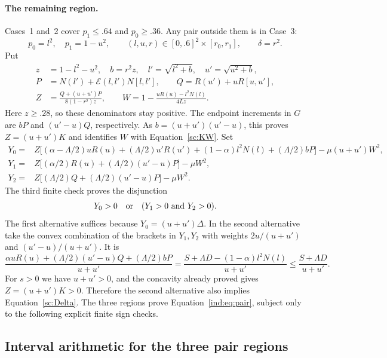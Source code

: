 \paragraph{The remaining region.}
Cases~1 and~2 cover $p_1\leq.64$ and $p_0\geq.36$.
Any pair outside them is in Case~3:
\[
 p_0=l^2,\quad p_1=1-u^2,\qquad
 (l,u,r)\in[0,.6]^2\times[r_0,r_1],\qquad \delta=r^2.
\]
Put
\begin{align}
 z&=1-l^2-u^2,\quad b=r^2z,\quad
 l'=\sqrt{l^2+b},\quad u'=\sqrt{u^2+b},\nonumber\\
 P&=N(l')+\mathcal E(l,l')N[l,l'],\qquad
 Q=R(u')+uR[u,u'],\label{sc:case3-data}\\
 Z&=\frac{Q+(u+u')P}{8(1-r^2)z},\qquad
 W=1-\frac{uR(u)-l^2N(l)}{4Lz}.\nonumber
\end{align}
Here $z\geq.28$, so these denominators stay positive.  The endpoint
increments in $G$ are $bP$ and $(u'-u)Q$, respectively.  As
$b=(u+u')(u'-u)$, this proves $Z=(u+u')K$ and identifies $W$ with
Equation~\eqref{sc:KW}.  Set
\begin{align}
 Y_0={}&Z\bigl[(\alpha-\Lambda/2)uR(u)
       +(\Lambda/2)u'R(u')+(1-\alpha)l^2N(l)
       +(\Lambda/2)bP\bigr]-\mu(u+u')W^2,\nonumber\\
 Y_1={}&Z\bigl[(\alpha/2)R(u)
                   +(\Lambda/2)(u'-u)P\bigr]-\mu W^2,\label{sc:Y}\\
 Y_2={}&Z\bigl[(\Lambda/2)Q
                   +(\Lambda/2)(u'-u)P\bigr]-\mu W^2.\nonumber
\end{align}
The third finite check proves the disjunction
\begin{equation}\label{sc:case3}
 Y_0>0\quad\hbox{or}\quad (Y_1>0\ \hbox{and}\ Y_2>0).
\end{equation}
The first alternative suffices because $Y_0=(u+u')\Delta$.
In the second alternative take the convex combination of the brackets
in $Y_1,Y_2$ with weights $2u/(u+u')$ and $(u'-u)/(u+u')$.
It is
\[
 \frac{\alpha uR(u)+(\Lambda/2)(u'-u)Q+(\Lambda/2)bP}{u+u'}
 =\frac{S+\Lambda D-(1-\alpha)l^2N(l)}{u+u'}
 \leq\frac{S+\Lambda D}{u+u'}.
\]
For $s>0$ we have $u+u'>0$, and the concavity already proved gives
$Z=(u+u')K>0$.  Therefore the second alternative also implies
Equation~\eqref{sc:Delta}.  The three regions prove Equation~\eqref{ind:eq:pair}, subject
only to the following explicit finite sign checks.

\subsection{Interval arithmetic for the three pair regions}\label{sc:interval}

